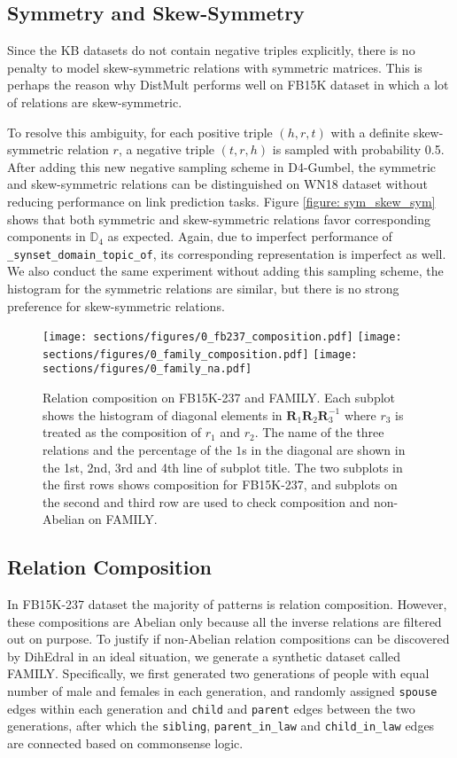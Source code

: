 \documentclass[11pt,a4paper]{article}
\begin{document}
\subsection{Symmetry and Skew-Symmetry} \label{subsec: skew-symmetry}
Since the KB datasets do not contain negative triples explicitly, there is no penalty to model skew-symmetric relations with symmetric matrices. This is perhaps the reason why DistMult performs well on FB15K dataset in which a lot of relations are skew-symmetric.


To resolve this ambiguity, for each positive triple $(h, r, t)$ with a definite skew-symmetric relation $r$, a negative triple $(t, r, h)$ is sampled with probability 0.5. After adding this new negative sampling scheme in D4-Gumbel, the symmetric and skew-symmetric relations can be distinguished on WN18 dataset without reducing performance on link prediction tasks. Figure \ref{figure: sym_skew_sym} shows that both symmetric and skew-symmetric relations favor corresponding components in $\mathbb{D}_4$ as expected. Again, due to imperfect performance of \verb|_synset_domain_topic_of|, its corresponding representation is imperfect as well. 
We also conduct the same experiment without adding this sampling scheme, the histogram for the symmetric relations are similar, but there is no strong preference for skew-symmetric relations.
\begin{figure}[h]
 \texttt{[image: sections/figures/0\_fb237\_composition.pdf]}
 \texttt{[image: sections/figures/0\_family\_composition.pdf]}
 \texttt{[image: sections/figures/0\_family\_na.pdf]}
\caption{Relation composition on FB15K-237 and FAMILY. Each subplot shows the histogram of diagonal elements in $\bm{R}_1\bm{R}_2\bm{R}_3^{-1}$ where $r_3$ is treated as the composition of $r_1$ and $r_2$. The name of the three relations and the percentage of the $1$s in the diagonal are shown in the 1st, 2nd, 3rd and 4th line of subplot title. The two subplots in the first rows shows composition for FB15K-237, and subplots on the second and third row are used to check composition and non-Abelian on FAMILY.}\label{fig: composition}
\end{figure}

\subsection{Relation Composition} \label{subsec: composition} 
In FB15K-237 dataset the majority of patterns is relation composition. However, these compositions are Abelian only because all the inverse relations are filtered out on purpose. To justify if non-Abelian relation compositions can be discovered by DihEdral in an ideal situation, we generate a synthetic dataset called FAMILY. Specifically, we first generated two generations of people with equal number of male and females in each generation, and randomly assigned \verb|spouse| edges within each generation and \verb|child| and \verb|parent| edges between the two generations, after which the \verb|sibling|, \verb|parent_in_law| and \verb|child_in_law| edges are connected based on commonsense logic.
\end{document}
